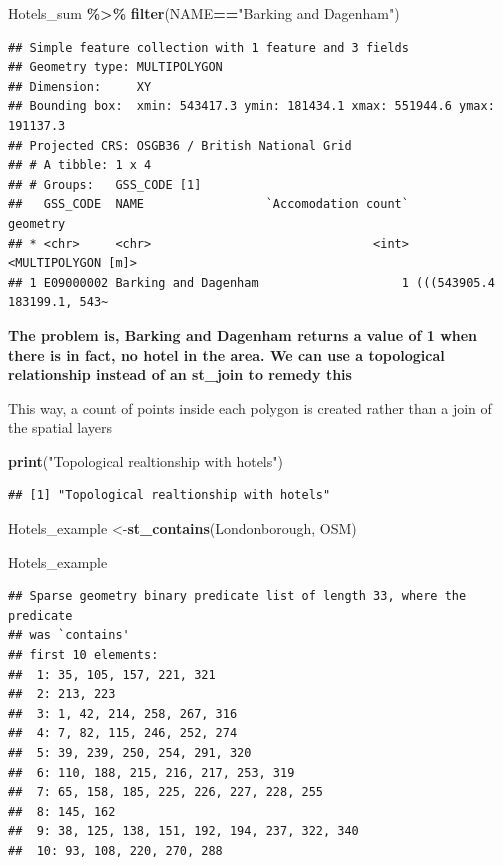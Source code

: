 \documentclass[
]{article}
\newenvironment{Shaded}{\begin{snugshade}}{\end{snugshade}}
\newcommand{\FunctionTok}[1]{\textcolor[rgb]{0.13,0.29,0.53}{\textbf{#1}}}
\newcommand{\NormalTok}[1]{#1}
\newcommand{\OtherTok}[1]{\textcolor[rgb]{0.56,0.35,0.01}{#1}}
\newcommand{\SpecialCharTok}[1]{\textcolor[rgb]{0.81,0.36,0.00}{\textbf{#1}}}
\newcommand{\StringTok}[1]{\textcolor[rgb]{0.31,0.60,0.02}{#1}}
\begin{document}
\begin{Shaded}
\begin{Highlighting}[]
\NormalTok{Hotels\_sum }\SpecialCharTok{\%\textgreater{}\%}
  \FunctionTok{filter}\NormalTok{(NAME}\SpecialCharTok{==}\StringTok{"Barking and Dagenham"}\NormalTok{)}
\end{Highlighting}
\end{Shaded}

\begin{verbatim}
## Simple feature collection with 1 feature and 3 fields
## Geometry type: MULTIPOLYGON
## Dimension:     XY
## Bounding box:  xmin: 543417.3 ymin: 181434.1 xmax: 551944.6 ymax: 191137.3
## Projected CRS: OSGB36 / British National Grid
## # A tibble: 1 x 4
## # Groups:   GSS_CODE [1]
##   GSS_CODE  NAME                 `Accomodation count`                   geometry
## * <chr>     <chr>                               <int>         <MULTIPOLYGON [m]>
## 1 E09000002 Barking and Dagenham                    1 (((543905.4 183199.1, 543~
\end{verbatim}

\textbf{The problem is, Barking and Dagenham returns a value of 1 when
there is in fact, no hotel in the area. We can use a topological
relationship instead of an st\_join to remedy this}

This way, a count of points inside each polygon is created rather than a
join of the spatial layers

\begin{Shaded}
\begin{Highlighting}[]
\FunctionTok{print}\NormalTok{(}\StringTok{"Topological realtionship with hotels"}\NormalTok{)}
\end{Highlighting}
\end{Shaded}

\begin{verbatim}
## [1] "Topological realtionship with hotels"
\end{verbatim}

\begin{Shaded}
\begin{Highlighting}[]
\NormalTok{Hotels\_example }\OtherTok{\textless{}{-}}\FunctionTok{st\_contains}\NormalTok{(Londonborough, OSM)}

\NormalTok{Hotels\_example}
\end{Highlighting}
\end{Shaded}

\begin{verbatim}
## Sparse geometry binary predicate list of length 33, where the predicate
## was `contains'
## first 10 elements:
##  1: 35, 105, 157, 221, 321
##  2: 213, 223
##  3: 1, 42, 214, 258, 267, 316
##  4: 7, 82, 115, 246, 252, 274
##  5: 39, 239, 250, 254, 291, 320
##  6: 110, 188, 215, 216, 217, 253, 319
##  7: 65, 158, 185, 225, 226, 227, 228, 255
##  8: 145, 162
##  9: 38, 125, 138, 151, 192, 194, 237, 322, 340
##  10: 93, 108, 220, 270, 288
\end{verbatim}
\end{document}

